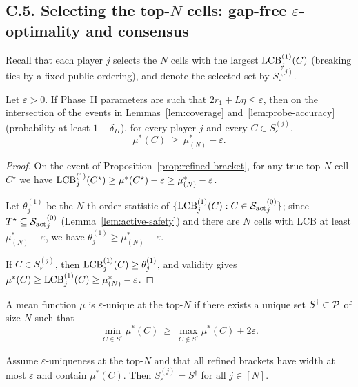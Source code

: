 \subsection*{C.5.\; Selecting the top-$N$ cells: gap-free $\varepsilon$-optimality and consensus}

Recall that each player $j$ selects the $N$ cells with the largest $\operatorname{LCB}^{(1)}_j(C)$
(breaking ties by a fixed public ordering), and denote the selected set by $S^{(j)}_\varepsilon$.

\begin{theorem}\label{thm:gapfree-safety}
Let $\varepsilon>0$. If Phase~II parameters are such that $2r_1+L\eta\le \varepsilon$,
then on the intersection of the events in Lemmas~\ref{lem:coverage} and~\ref{lem:probe-accuracy} (probability at least $1-\delta_{II}$), for every player $j$ and every $C\in S^{(j)}_\varepsilon$,
\[
\mu^\ast(C)\ \ge\ \mu^\ast_{(N)} - \varepsilon.
\]
\end{theorem}

\begin{proof}
On the event of Proposition~\ref{prop:refined-bracket}, for any true top-$N$ cell $C^\star$ we have
$\operatorname{LCB}^{(1)}_j(C^\star)\ge \mu^\ast(C^\star)-\varepsilon\ge \mu^\ast_{(N)}-\varepsilon$.

Let $\theta^{(1)}_j$ be the $N$-th order statistic of $\{\operatorname{LCB}^{(1)}_j(C):C\in {\mathcal{S}_{\mathrm{act}}}^{(0)}_j\}$; since $T^\star\subseteq {\mathcal{S}_{\mathrm{act}}}^{(0)}_j$ (Lemma~\ref{lem:active-safety}) and there are $N$ cells with LCB at least $\mu^\ast_{(N)}-\varepsilon$, we have $\theta^{(1)}_j\ge \mu^\ast_{(N)}-\varepsilon$.

If $C\in S^{(j)}_\varepsilon$, then $\operatorname{LCB}^{(1)}_j(C)\ge \theta^{(1)}_j$, and validity gives
$\mu^\ast(C)\ge \operatorname{LCB}^{(1)}_j(C)\ge \mu^\ast_{(N)}-\varepsilon$.
\end{proof}

\begin{definition}\label{def:eps-uniq}
A mean function $\mu$ is $\varepsilon$-unique at the top-$N$ if there exists a unique set $S^\dagger\subset \mathcal{P}$ of size $N$ such that
\[
\min_{C\in S^\dagger} \mu^\ast(C) \ \ge\ \max_{C\notin S^\dagger} \mu^\ast(C) + 2\varepsilon.
\]
\end{definition}

\begin{lemma}\label{lem:consensus}
Assume $\varepsilon$-uniqueness at the top-$N$ and that all refined brackets have width at most $\varepsilon$ and contain $\mu^\ast(C)$.
Then $S^{(j)}_\varepsilon = S^\dagger$ for all $j\in[N]$.
\end{lemma}

